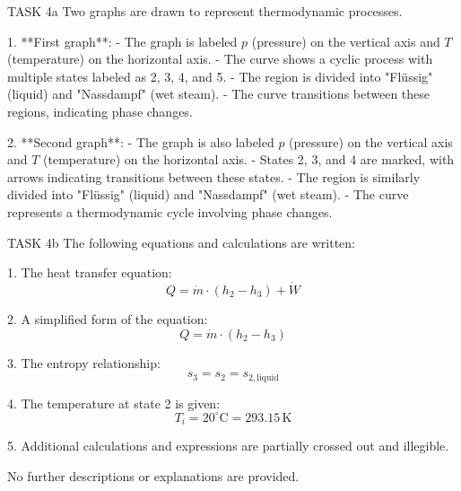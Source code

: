 TASK 4a  
Two graphs are drawn to represent thermodynamic processes.  

1. **First graph**:  
   - The graph is labeled \( p \) (pressure) on the vertical axis and \( T \) (temperature) on the horizontal axis.  
   - The curve shows a cyclic process with multiple states labeled as 2, 3, 4, and 5.  
   - The region is divided into "Flüssig" (liquid) and "Nassdampf" (wet steam).  
   - The curve transitions between these regions, indicating phase changes.  

2. **Second graph**:  
   - The graph is also labeled \( p \) (pressure) on the vertical axis and \( T \) (temperature) on the horizontal axis.  
   - States 2, 3, and 4 are marked, with arrows indicating transitions between these states.  
   - The region is similarly divided into "Flüssig" (liquid) and "Nassdampf" (wet steam).  
   - The curve represents a thermodynamic cycle involving phase changes.  

TASK 4b  
The following equations and calculations are written:  

1. The heat transfer equation:  
\[
Q = \dot{m} \cdot (h_2 - h_3) + \dot{W}
\]  

2. A simplified form of the equation:  
\[
Q = \dot{m} \cdot (h_2 - h_3)
\]  

3. The entropy relationship:  
\[
s_3 = s_2 = s_{2, \text{liquid}}
\]  

4. The temperature at state 2 is given:  
\[
T_i = 20^\circ\text{C} = 293.15 \, \text{K}
\]  

5. Additional calculations and expressions are partially crossed out and illegible.  

No further descriptions or explanations are provided.